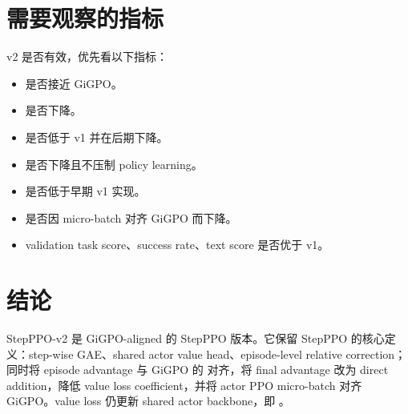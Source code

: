 \documentclass[10pt]{ctexart}
\begin{document}
\section*{需要观察的指标}
v2 是否有效，优先看以下指标：
\begin{itemize}
\item {} 是否接近 GiGPO。
\item {} 是否下降。
\item {} 是否低于 v1 并在后期下降。
\item {} 是否下降且不压制 policy learning。
\item {} 是否低于早期 v1 实现。
\item {} 是否因 micro-batch 对齐 GiGPO 而下降。
\item validation task score、success rate、text score 是否优于 v1。
\end{itemize}

\section*{结论}
StepPPO-v2 是 GiGPO-aligned 的 StepPPO 版本。它保留 StepPPO 的核心定义：step-wise GAE、shared actor value head、episode-level relative correction；同时将 episode advantage 与 GiGPO 的  对齐，将 final advantage 改为 direct addition，降低 value loss coefficient，并将 actor PPO micro-batch 对齐 GiGPO。value loss 仍更新 shared actor backbone，即 。
\end{document}
